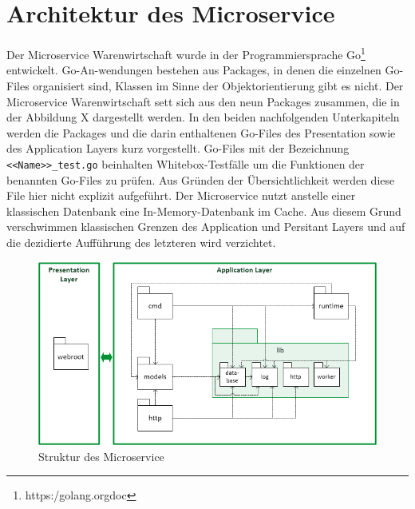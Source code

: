 \section{Architektur des Microservice}
\label{sec: Architektur des Microservice}
Der Microservice Warenwirtschaft wurde in der Programmiersprache Go\footnote{https:\//golang.org\/doc\/} entwickelt. Go-An-wendungen bestehen aus Packages, in denen die einzelnen Go-Files organisiert sind, Klassen im Sinne der Objektorientierung gibt es nicht. Der Microservice Warenwirtschaft sett sich aus den neun Packages zusammen, die in der Abbildung X dargestellt werden. In den beiden nachfolgenden Unterkapiteln werden die Packages und die darin enthaltenen Go-Files des Presentation  sowie des Application Layers kurz vorgestellt. Go-Files mit der Bezeichnung \texttt{<<Name>>\_test.go} beinhalten Whitebox-Testfälle um die Funktionen der benannten Go-Files zu prüfen. Aus Gründen der Übersichtlichkeit werden diese File hier nicht explizit aufgeführt. 
Der Microservice nutzt anstelle einer klassischen Datenbank eine In-Memory-Datenbank im Cache. Aus diesem Grund verschwimmen klassischen Grenzen des Application und Persitant Layers und auf die dezidierte Aufführung des letzteren wird verzichtet.

\begin{figure}[H]
	\begin{center}
	\includegraphics[width=0.65 \textwidth]{./pics/struktur.png}
	\end{center}
	\caption{Struktur des Microservice}
	\label{pic:Struktur des Microservice}
\end{figure}


